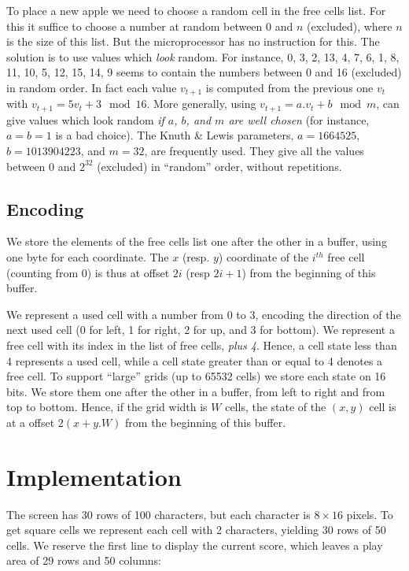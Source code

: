 To place a new apple we need to choose a random cell in the free cells list.
For this it suffice to choose a number at random between 0 and $n$ (excluded),
where $n$ is the size of this list. But the microprocessor has no instruction
for this. The solution is to use values which {\em look} random. For instance,
0, 3, 2, 13, 4, 7, 6, 1, 8, 11, 10, 5, 12, 15, 14, 9 seems to contain the
numbers between 0 and 16 (excluded) in random order. In fact each value
$v_{t+1}$ is computed from the previous one $v_t$ with $v_{t+1}=5v_t+3 \mod
16$. More generally, using $v_{t+1}=a.v_t+b \mod m$, can give values which
look random {\em if $a$, $b$, and $m$ are well chosen} (for instance, $a=b=1$
is a bad choice). The Knuth \& Lewis parameters, $a=1664525$, $b=1013904223$,
and $m=32$, are frequently used. They give all the values between 0 and
$2^{32}$ (excluded) in ``random'' order, without repetitions.

\subsection{Encoding}\label{subsection:snake-encodings}

We store the elements of the free cells list one after the other in a buffer,
using one byte for each coordinate. The $x$ (resp. $y$) coordinate of the
$i^{th}$ free cell (counting from 0) is thus at offset $2i$ (resp $2i+1$) from
the beginning of this buffer.

We represent a used cell with a number from 0 to 3, encoding the direction of
the next used cell (0 for left, 1 for right, 2 for up, and 3 for bottom). We
represent a free cell with its index in the list of free cells, {\em plus 4}.
Hence, a cell state less than 4 represents a used cell, while a cell state
greater than or equal to 4 denotes a free cell. To support ``large'' grids (up
to 65532 cells) we store each state on 16 bits. We store them one after the
other in a buffer, from left to right and from top to bottom. Hence, if the
grid width is $W$ cells, the state of the $(x,y)$ cell is at a offset
$2(x+y.W)$ from the beginning of this buffer.

\section{Implementation}


The screen has 30 rows of 100 characters, but each character is $8\times16$
pixels. To get square cells we represent each cell with 2 characters, yielding
30 rows of 50 cells. We reserve the first line to display the current score,
which leaves a play area of 29 rows and 50 columns:

